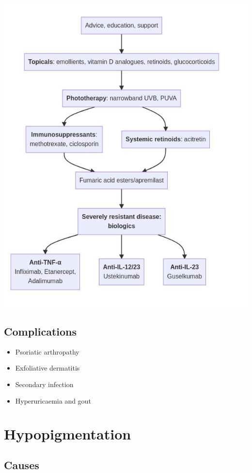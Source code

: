 \documentclass[
  12pt,
]{memoir}
\providecommand{\tightlist}{%
  \setlength{\itemsep}{0pt}\setlength{\parskip}{0pt}}
\begin{document}
\includegraphics[width=.85\textwidth]{../assets/med/psoriasis.jpg}

\hypertarget{complications}{%
\subsection{Complications}\label{complications}}

\begin{itemize}
\tightlist
\item
  Psoriatic arthropathy
\item
  Exfoliative dermatitis
\item
  Secondary infection
\item
  Hyperuricaemia and gout
\end{itemize}

\pagebreak

\hypertarget{hypopigmentation}{%
\section{Hypopigmentation}\label{hypopigmentation}}

\hypertarget{causes-1}{%
\subsection{Causes}\label{causes-1}}
\end{document}
